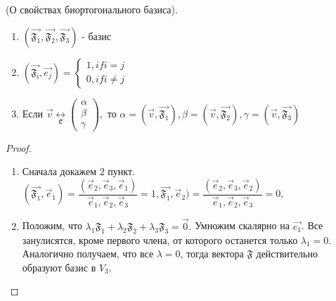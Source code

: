 \begin{theorem}
	(О свойствах биортогонального базиса). 
	\begin{enumerate}
		\item \((\vec{\mathfrak{F_1}},\vec{\mathfrak{F_2}},\vec{\mathfrak{F_3}})\) - базис
		\item \((\vec{\mathfrak{F_i}}, \vec{e_j}) = \left\{
		\begin{gathered}
			1, if i = j \\
			0, if i \ne j
		\end{gathered}
		\right.\)
		\item Если \(\vec v\underset{\mathfrak{E}}{\longleftrightarrow}\begin{pmatrix}
			\alpha \\ \beta \\ \gamma
		\end{pmatrix}, \) то \(\alpha = (\vec v, \vec{\mathfrak{F_1}}),
		\beta = (\vec v, \vec{\mathfrak{F_2}}),
		\gamma = (\vec v, \vec{\mathfrak{F_3}})\)
	\end{enumerate}
\end{theorem}
\begin{proof}
	\begin{enumerate}
		\item Сначала докажем 2 пункт. \((\vec{\mathfrak{F_1}}, \vec e_1) = \dfrac{(\vec e_2, \vec e_3, \vec e_1)}{\vec e_1, \vec e_2, \vec e_3} = 1,
		\vec{\mathfrak{F_1}}, \vec e_2) = \dfrac{(\vec e_2, \vec e_3, \vec e_2)}{\vec e_1, \vec e_2, \vec e_3} = 0,\)
		\item Положим, что \(\lambda_1\mathfrak{F_1}+\lambda_2\mathfrak{F_2}+\lambda_3\mathfrak{F_3}=\vec 0.\) Умножим скалярно на $\vec{e_1}$. Все занулисятся, кроме первого члена, от которого останется только \(\lambda_1 = 0\). Аналогично получаем, что все $\lambda = 0$, тогда вектора $\mathfrak{F}$ действительно образуют базис в \(V_3\). 
	\end{enumerate}
\end{proof}
